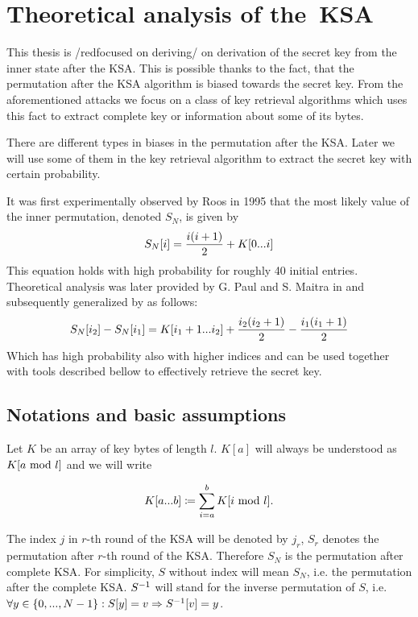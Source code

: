 \chapter{Theoretical analysis of the~KSA}

This thesis is /red{focused on deriving/ on derivation of} the secret key from the inner state after the KSA. This is possible thanks to the fact, that the permutation after the KSA algorithm is biased towards the secret key. From the aforementioned attacks we focus on a class of key retrieval algorithms which uses this fact to extract complete key or information about some of its bytes. 

There are different types in biases in the permutation after the KSA. Later we will use some of them in the key retrieval algorithm to extract the secret key with certain probability. 



It was first experimentally observed by Roos in 1995 \cite{roos} that the most likely value of the inner permutation, denoted $ S_{N}$, is given by 
\[ S_{N}[i] = \dfrac{i(i+1)}{2} + K[{0}...{i}] \]
 This equation holds with high probability for roughly 40 initial entries. Theoretical analysis was later provided by G. Paul and S. Maitra in  and subsequently generalized by  as follows:
 \[ S_{N}[i_{2}] - S_{N}[i_{1}] = K[{i_{1}+1}...{i_{2}}] + \dfrac{i_{2}(i_{2}+1)}{2} - \dfrac{i_{1}(i_{1}+1)}{2} \]
Which has high probability also with higher indices and can be used together with tools described bellow to effectively retrieve the secret key. 



\section{Notations and basic assumptions}

\begin{notation}
	
	Let $ K $ be an array of key bytes of length $ l $. $ K[a] $ will always be understood as $ K[a \ \text{mod}\ l] $ and we will write
	
	\[K[{a}...{b}] \coloneqq \sum\limits_{i=a}^{b}K[i \ \text{mod}\ l]. 	\]
	
	 
	
	The index $ j $ in $ r $-th round of the KSA will be denoted by $ j_{r} $,  $ S_{r} $ denotes the permutation after $ r $-th round of the KSA.  Therefore $ S_{N} $ is the permutation after complete KSA. For simplicity, $ S $ without index will mean $ S_{N} $, i.e. the permutation after the complete KSA. 	
	$ 	S^{-1} $ will stand for the inverse permutation of $ S $, i.e. $ \forall y \in \{0, ... , N-1\}: S[y] = v \Rightarrow S^{-1}[v] = y$. 
	

	
\end{notation}


